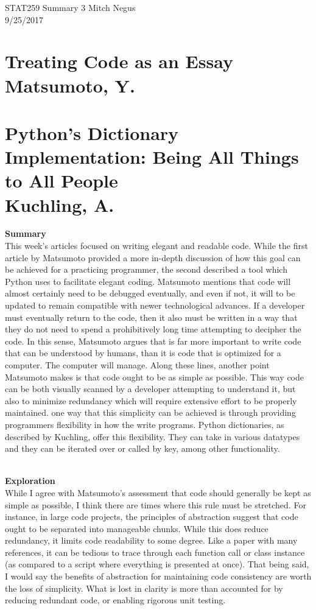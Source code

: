 \documentclass{report}
\newcommand{\tab}{\-\hspace{1cm}}
\begin{document}
\thispagestyle{empty}
\sffamily

\large {STAT259 Summary {3} \hfill Mitch Negus\\
		\hspace*{\fill} 9/25/2017\\ }
\section*{\textsf{Treating Code as an Essay \\ \normalsize Matsumoto, Y.}}
\section*{\textsf{Python’s Dictionary Implementation: Being All Things to All People \\ \normalsize Kuchling, A.}}

\textbf{Summary}\\
\tab This week's articles focused on writing elegant and readable code. While the first article by Matsumoto provided a more in-depth discussion of how this goal can be achieved for a practicing programmer, the second described a tool which Python uses to facilitate elegant coding. Matsumoto mentions that code will almost certainly need to be debugged eventually, and even if not, it will to be updated to remain compatible with newer technological advances. If a developer must eventually return to the code, then it also must be written in a way that they do not need to spend a prohibitively long time attempting to decipher the code. In this sense, Matsumoto argues that is far more important to write code that can be understood by humans, than it is code that is optimized for a computer. The computer will manage. Along these lines, another point Matsumoto makes is that code ought to be as simple as possible. This way code can be both visually scanned by a developer attempting to understand it, but also to minimize redundancy which will require extensive effort to be properly maintained. one way that this simplicity can be achieved is through providing programmers flexibility in how the write programs. Python dictionaries, as described by Kuchling, offer this flexibility. They can take in various datatypes and they can be iterated over or called by key, among other functionality.

\-\\
\textbf{Exploration}\\
\tab While I agree with Matsumoto's assessment that code should generally be kept as simple as possible, I think there are times where this rule must be stretched. For instance, in large code projects, the principles of abstraction suggest that code ought to be separated into manageable chunks. While this does reduce redundancy, it limits code readability to some degree. Like a paper with many references, it can be tedious to trace through each function call or class instance (as compared to a script where everything is presented at once). That being said, I would say the benefits of abstraction for maintaining code consistency are worth the loss of simplicity. What is lost in clarity is more than accounted for by reducing redundant code, or enabling rigorous unit testing.
\end{document}
